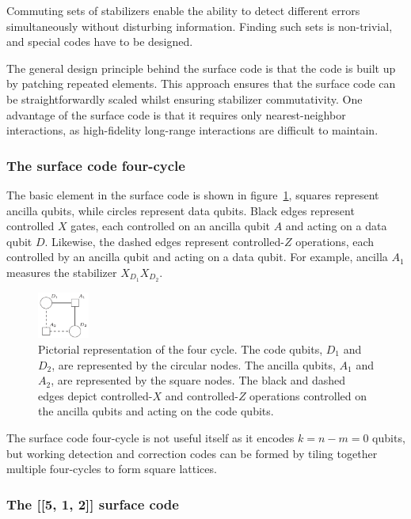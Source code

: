 Commuting sets of stabilizers enable the ability to detect different errors simultaneously without disturbing information. Finding such sets is non-trivial, and special codes have to be designed.

The general design principle behind the surface code is that the code is built up by patching repeated elements. This approach ensures that the surface code can be straightforwardly scaled whilst ensuring stabilizer commutativity. One advantage of the surface code is that it requires only nearest-neighbor interactions, as high-fidelity long-range interactions are difficult to maintain.

\subsubsection{The surface code four-cycle}

The basic element in the surface code is shown in figure~\ref{fig:four_cycle}, squares represent ancilla qubits, while circles represent data qubits. Black edges represent controlled $X$ gates, each controlled on an ancilla qubit $A$ and acting on a data qubit $D$. Likewise, the dashed edges represent controlled-$Z$ operations, each controlled by an ancilla qubit and acting on a data qubit.
For example, ancilla $A_1$ measures the stabilizer $X_{D_1}X_{D_2}$.
\begin{figure}[h]
    \centering
    \includegraphics[width=0.15\textwidth]{sections/2_review_surface_code/four_cycle.png}
    \caption{Pictorial representation of the four cycle. The code qubits, $D_1$ and $D_2$, are represented by the circular nodes. The ancilla qubits, $A_1$ and $A_2$, are represented by the square nodes. The black and dashed edges depict controlled-$X$ and controlled-$Z$ operations controlled on the ancilla qubits and acting on the code qubits.}
    \label{fig:four_cycle}
\end{figure}
The surface code four-cycle is not useful itself as it encodes $k=n-m=0$ qubits, but working detection and correction codes can be formed by tiling together multiple four-cycles to form square lattices.

\subsubsection{The [[5, 1, 2]] surface code}


